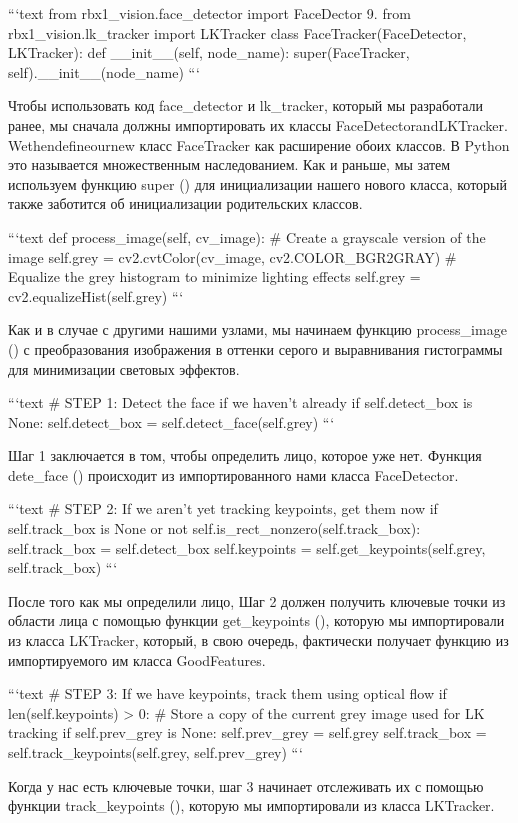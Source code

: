 ```text
from rbx1_vision.face_detector import FaceDector 9. from rbx1_vision.lk_tracker import LKTracker
class FaceTracker(FaceDetector, LKTracker):
def __init__(self, node_name):
super(FaceTracker, self).__init__(node_name)
```

Чтобы использовать код face\_detector и lk\_tracker, который мы разработали ранее, мы сначала должны импортировать их классы FaceDetectorandLKTracker. Wethendefineournew класс FaceTracker как расширение обоих классов. В Python это называется множественным наследованием. Как и раньше, мы затем используем функцию super () для инициализации нашего нового класса, который также заботится об инициализации родительских классов.

```text
def process_image(self, cv_image):
# Create a grayscale version of the image
self.grey = cv2.cvtColor(cv_image, cv2.COLOR_BGR2GRAY)
# Equalize the grey histogram to minimize lighting effects
self.grey = cv2.equalizeHist(self.grey)
```

Как и в случае с другими нашими узлами, мы начинаем функцию process\_image () с преобразования изображения в оттенки серого и выравнивания гистограммы для минимизации световых эффектов.

```text
# STEP 1: Detect the face if we haven't already
if self.detect_box is None:
self.detect_box = self.detect_face(self.grey)
```

Шаг 1 заключается в том, чтобы определить лицо, которое уже нет. Функция dete\_face () происходит из импортированного нами класса FaceDetector.

```text
# STEP 2: If we aren't yet tracking keypoints, get them now
if self.track_box is None or not self.is_rect_nonzero(self.track_box):
self.track_box = self.detect_box
self.keypoints = self.get_keypoints(self.grey, self.track_box)
```

После того как мы определили лицо, Шаг 2 должен получить ключевые точки из области лица с помощью функции get\_keypoints (), которую мы импортировали из класса LKTracker, который, в свою очередь, фактически получает функцию из импортируемого им класса GoodFeatures.

```text
# STEP 3: If we have keypoints, track them using optical flow
if len(self.keypoints) > 0:
# Store a copy of the current grey image used for LK tracking if self.prev_grey is None:
self.prev_grey = self.grey
self.track_box = self.track_keypoints(self.grey, self.prev_grey)
```

Когда у нас есть ключевые точки, шаг 3 начинает отслеживать их с помощью функции track\_keypoints (), которую мы импортировали из класса LKTracker.


